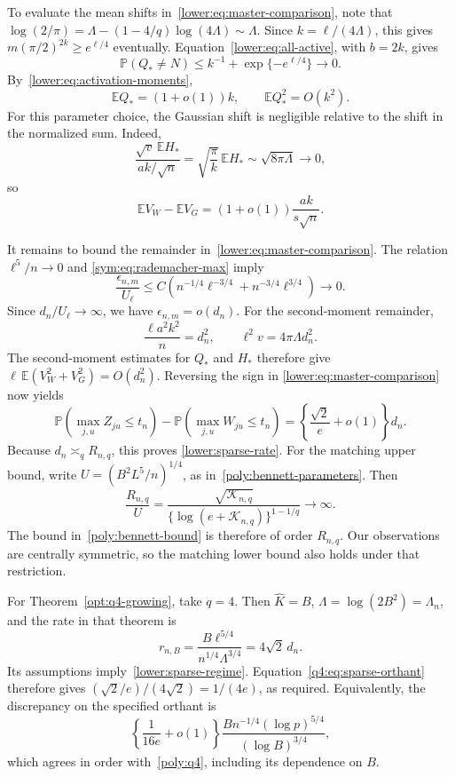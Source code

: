 \documentclass[11pt,letterpaper]{article}
\theoremstyle{remark}
\newcommand{\E}{\mathbb E}
\newcommand{\Pp}{\mathbb P}
\begin{document}
To evaluate the mean shifts in~\eqref{lower:eq:master-comparison},
note that
\(\log(2/\pi)=\Lambda-(1-4/q)\log(4\Lambda)\sim\Lambda\).
Since \(k=\ell/(4\Lambda)\), this gives
\(m(\pi/2)^{2k}\ge e^{\ell/4}\) eventually.
Equation~\eqref{lower:eq:all-active}, with \(b=2k\), gives
\[
 \Pp(Q_*\ne N)\le k^{-1}+\exp\{-e^{\ell/4}\}\longrightarrow0.
\]
By~\eqref{lower:eq:activation-moments},
\begin{equation}
 \E Q_*=(1+o(1))k,\qquad \E Q_*^2=O(k^2).
 \label{q4:eq:sparse-max-moments}
\end{equation}
For this parameter choice, the Gaussian shift is negligible
relative to the shift in the normalized sum. Indeed,
\[
 \frac{\sqrt v\,\E H_*}{ak/\sqrt n}
 =\sqrt{\frac\pi k}\,\E H_*
 \sim\sqrt{8\pi\Lambda}\longrightarrow0,
\]
so
\begin{equation}
 \E V_W-\E V_G=(1+o(1))\frac{ak}{s\sqrt n}.
 \label{q4:eq:sparse-mean-gap}
\end{equation}

It remains to bound the remainder
in~\eqref{lower:eq:master-comparison}. The relation \(\ell^5/n\to0\) and
\eqref{sym:eq:rademacher-max} imply
\[
 \frac{\epsilon_{n,m}}{U_\ell}
 \le C\left(n^{-1/4}\ell^{-3/4}
             +n^{-3/4}\ell^{3/4}\right)\longrightarrow0.
\]
Since \(d_n/U_\ell\to\infty\), we have \(\epsilon_{n,m}=o(d_n)\).
For the second-moment remainder,
\[
 \frac{\ell a^2k^2}{n}=d_n^2,\qquad
 \ell^2v=4\pi\Lambda d_n^2.
\]
The second-moment estimates for \(Q_*\) and \(H_*\) therefore give
\(\ell\,\E(V_W^2+V_G^2)=O(d_n^2)\). Reversing the sign in
\eqref{lower:eq:master-comparison} now yields
\begin{equation}
 \Pp(\max_{j,u}Z_{ju}\le t_n)-\Pp(\max_{j,u}W_{ju}\le t_n)
 =\left\{\frac{\sqrt2}{e}+o(1)\right\}d_n.
 \label{q4:eq:sparse-orthant}
\end{equation}
Because \(d_n\asymp_q R_{n,q}\), this proves
\eqref{lower:sparse-rate}. For the matching upper bound, write
\(U=(B^2L^5/n)^{1/4}\), as in~\eqref{poly:bennett-parameters}.
Then
\[
 \frac{R_{n,q}}{U}
 =\frac{\sqrt{\mathcal K_{n,q}}}
        {\{\log(e+\mathcal K_{n,q})\}^{1-1/q}}\longrightarrow\infty.
\]
The bound in~\eqref{poly:bennett-bound} is therefore of order
\(R_{n,q}\). Our observations are centrally symmetric, so the
matching lower bound also holds under that restriction.

For Theorem~\ref{opt:q4-growing}, take \(q=4\).
Then \(\widehat K=B\), \(\Lambda=\log(2B^2)=\Lambda_n\), and
the rate in that theorem is
\[
 r_{n,B}=\frac{B\ell^{5/4}}{n^{1/4}\Lambda^{3/4}}
         =4\sqrt2\,d_n.
\]
Its assumptions imply~\eqref{lower:sparse-regime}.
Equation~\eqref{q4:eq:sparse-orthant} therefore gives
\((\sqrt2/e)/(4\sqrt2)=1/(4e)\), as required. Equivalently, the discrepancy on the
specified orthant is
\[
 \left\{\frac1{16e}+o(1)\right\}
 \frac{B n^{-1/4}(\log p)^{5/4}}{(\log B)^{3/4}},
\]
which agrees in order with~\eqref{poly:q4}, including its dependence on \(B\).
\end{document}
